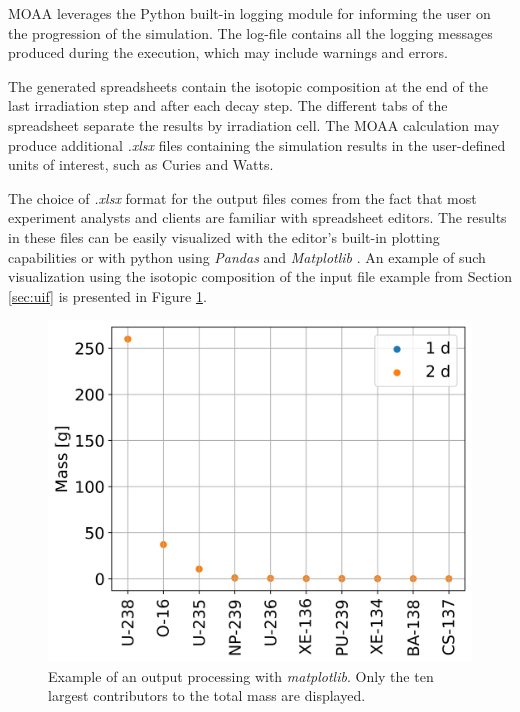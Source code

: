 MOAA leverages the Python built-in logging module for informing the user on the progression of the simulation.
The log-file contains all the logging messages produced during the execution, which may include warnings and errors.

The generated spreadsheets contain the isotopic composition at the end of the last irradiation step and after each decay step.
The different tabs of the spreadsheet separate the results by irradiation cell.
The MOAA calculation may produce additional \textit{.xlsx} files containing the simulation results in the user-defined units of interest, such as Curies and Watts.

The choice of \textit{.xlsx} format for the output files comes from the fact that most experiment analysts and clients are familiar with spreadsheet editors.
The results in these files can be easily visualized with the editor's built-in plotting capabilities or with python using \textit{Pandas} and \textit{Matplotlib} \cite{matplotlib}.
An example of such visualization using the isotopic composition of the input file example from Section \ref{sec:uif} is presented in Figure \ref{fig:output-ex}.

\begin{figure}[htbp!]
  \begin{center}
    \includegraphics[scale=0.60]{figures/test1_grams}
  \end{center}
  \caption{Example of an output processing with \textit{matplotlib}. Only the ten largest contributors to the total mass are displayed.}
  \label{fig:output-ex}
\end{figure}

